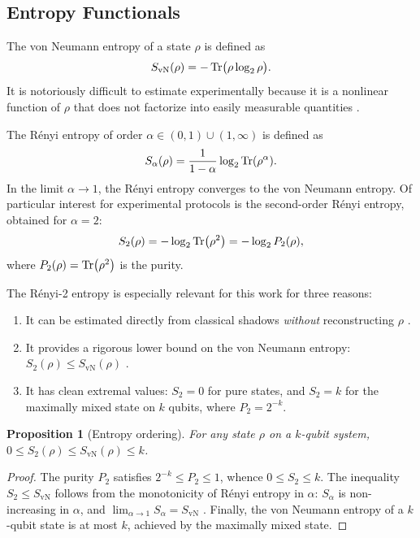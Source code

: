 \documentclass[12pt,a4paper,oneside]{book}
\theoremstyle{plain}
\newtheorem{proposition}[theorem]{Proposition}
\theoremstyle{definition}
\theoremstyle{remark}
\begin{document}
\subsection{Entropy Functionals}

The von Neumann entropy of a state $\rho$ is defined as
\begin{equation}
    S_{\text{vN}}(\rho) = -\Tr\bigl(\rho \log_2 \rho\bigr).
\end{equation}
It is notoriously difficult to estimate experimentally because it is a nonlinear function of $\rho$ that does not factorize into easily measurable quantities \cite{horodecki2009quantum}.

The R\'enyi entropy of order $\alpha \in (0,1) \cup (1,\infty)$ is defined as \cite{renyi1961entropy}
\begin{equation}
    S_\alpha(\rho) = \frac{1}{1 - \alpha} \log_2 \Tr(\rho^\alpha).
\end{equation}
In the limit $\alpha \to 1$, the R\'enyi entropy converges to the von Neumann entropy. Of particular interest for experimental protocols is the second-order R\'enyi entropy, obtained for $\alpha = 2$:
\begin{equation}
    \label{eq:renyi2}
    S_2(\rho) = -\log_2 \Tr(\rho^2) = -\log_2 P_2(\rho),
\end{equation}
where $P_2(\rho) = \Tr(\rho^2)$ is the purity.

The R\'enyi-2 entropy is especially relevant for this work for three reasons:
\begin{enumerate}
    \item It can be estimated directly from classical shadows \emph{without} reconstructing $\rho$ \cite{huang2020predicting, elben2020cross, brydges2019probing}.
    \item It provides a rigorous lower bound on the von Neumann entropy: $S_2(\rho) \leq S_{\text{vN}}(\rho)$ \cite{renyi1961entropy}.
    \item It has clean extremal values: $S_2 = 0$ for pure states, and $S_2 = k$ for the maximally mixed state on $k$ qubits, where $P_2 = 2^{-k}$.
\end{enumerate}

\begin{proposition}[Entropy ordering]\label{prop:entropy_ordering}
For any state $\rho$ on a $k$-qubit system, $0 \leq S_2(\rho) \leq S_{\text{vN}}(\rho) \leq k$.
\end{proposition}

\begin{proof}
The purity $P_2$ satisfies $2^{-k} \leq P_2 \leq 1$, whence $0 \leq S_2 \leq k$. The inequality $S_2 \leq S_{\text{vN}}$ follows from the monotonicity of R\'enyi entropy in $\alpha$: $S_\alpha$ is non-increasing in $\alpha$, and $\lim_{\alpha \to 1} S_\alpha = S_{\text{vN}}$ \cite{renyi1961entropy}. Finally, the von Neumann entropy of a $k$-qubit state is at most $k$, achieved by the maximally mixed state.
\end{proof}
\end{document}
